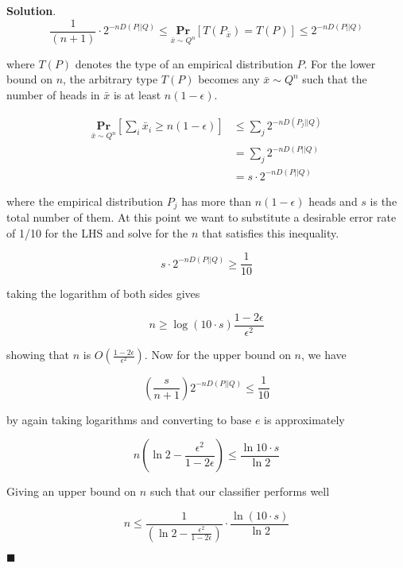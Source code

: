 \documentclass[12pt]{article}
\theoremstyle{definition}
\newenvironment{s}{%
        \begin{trivlist} \item \textbf{Solution}. }{%
            \hspace*{\fill} $\blacksquare$\end{trivlist}}%
\begin{document}
{\begin{s}
\begin{equation*}
\frac{1}{(n+1)}\cdot 2^{-nD(P||Q)} \leq \underset{\bar{x} \sim Q^{n}}{\mathbf{Pr}}\left[T(P_{\bar{x}}) = T(P)\right] \leq 2^{-nD(P||Q)}
\end{equation*}

where $T(P)$ denotes the type of an empirical distribution $P$. For the lower bound on $n$, the arbitrary type $T(P)$ becomes any $\bar{x}\sim Q^{n}$ such that the number of heads in $\bar{x}$ is at least $n(1-\epsilon)$. 

\begin{align*}
\underset{\bar{x} \sim Q^{n}}{\mathbf{Pr}}\left[\sum_{i}\bar{x}_{i} \geq 
n(1-\epsilon)\right]&\leq \sum_{j} 2^{-nD(P_{j}||Q)} \\
&= \sum_{j} 2^{-nD(P||Q)}\\
&= s\cdot 2^{-nD(P||Q)}
\end{align*}

where the empirical distribution $P_{j}$ has more than $n(1-\epsilon)$ heads and $s$ is the total number of them. At this point we want to substitute a desirable error rate of 1/10 for the LHS and solve for the $n$ that satisfies this inequality.

\begin{equation*}
s \cdot 2^{-nD(P||Q)} \geq \frac{1}{10}
\end{equation*}

taking the logarithm of both sides gives

\begin{equation*}
n \geq \log \left(10\cdot s\right)\frac{1-2\epsilon}{\epsilon^{2}}
\end{equation*}

showing that $n$ is $O(\frac{1-2\epsilon}{\epsilon^{2}})$. Now for the upper bound on $n$, we have

\begin{equation*}
\left(\frac{s}{n+1}\right) 2^{-nD(P||Q)} \leq \frac{1}{10}
\end{equation*}

by again taking logarithms and converting to base $e$ is approximately

\begin{equation*}
n(\ln 2 -\frac{\epsilon^{2}}{1-2\epsilon})\leq \frac{\ln 10\cdot s}{\ln 2}
\end{equation*}

Giving an upper bound on $n$ such that our classifier performs well

\begin{equation*}
n \leq \frac{1}{(\ln 2 -\frac{\epsilon^{2}}{1-2\epsilon})}\cdot \frac{\ln \left(10\cdot s\right)}{\ln 2}
\end{equation*}


\end{s}}
\end{document}
